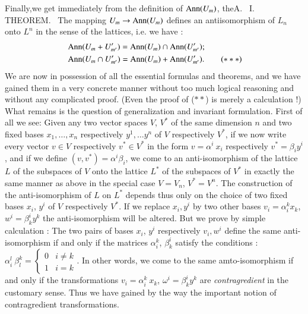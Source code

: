Finally,\pageoriginale we get immediately from the definition of $\operatorname{Ann}
(U_m)$, the\break A.~ I.~ THEOREM. ~The mapping $U_m \to \operatorname{Ann} (U_m)$
defines an antiisomorphism of $L_n$ onto $L^n$ in the sense of the
lattices, i.e. we have :
\begin{align*}
&\operatorname{Ann} (U_m + U'_{m'}) = \operatorname{Ann} (U_m) \cap \operatorname{Ann} (U'_{m'}) ; \\
&\operatorname{Ann} (U_m  \cap U'_{m'}) = \operatorname{Ann} (U_m) + \operatorname{Ann} (U'_{m'}). \tag{$\ast\ast\ast$}
\end{align*}
We are now in possession of all the essential formulas and theorems,
and we have gained them in a very concrete manner without too much
logical reasoning and without any complicated proof. (Even the proof
of ($\ast\ast$) is merely a calculation !) What remains is the
question of generalization and invariant formulation. First of all we
see: Given any two vector spaces $V$, $V^\ast$ of the same dimension
$n$ and two fixed bases $x_1, \ldots, x_n$ respectively $y^1, \ldots
y^n$ of $V$ respectively $V^\ast$, if we now write every vector $v \in
V$ respectively $v^\ast \in V^\ast$ in the form $v = \alpha^i ~ x_i$
respectively $v^\ast = \beta_i y^i$, and if we define $(v, v^\ast) =
\alpha^i \beta_i$, we come to an anti-isomorphism of the lattice $L$
of the subspaces of $V$ onto the lattice $L^\ast$ of the subspaces of
$V^\ast$ in exactly the same manner as above in the special case $V =
V_n$, $V^\ast = V^n$. The construction of the anti-isomorphism of $L$
on $L^\ast$ depends thus only on the choice of two fixed bases $x_i$,
$y^i$ of $V$ respectively $V^\ast$. If we replace $x_i, y^i$ by two
other bases $v_i = \alpha^k_i x_k$, $w^i = \beta^i_k y^k$ the
anti-isomorphism will be altered. But we prove by simple calculation :
The two pairs of bases $x_i$, $y^i$ respectively $v_i, w^i$ define the
same anti-isomorphism if and only if the matrices $\alpha^k_i$,
$\beta^i_k$ satisfy the conditions : $\alpha^l_i ~ \beta^k_l
= \begin{cases}
0 & i \neq k \\
 1 & i = k
\end{cases}$. In other words, we come to the same amto-isomorphism if
and only if the transformations $v_i = \alpha^k_i ~x_k$, $\omega^i =
\beta^i_k y^k$ are \textit{contragredient} in the customary
sense. Thus we have gained by the way the important notion of
contragredient transformations.

